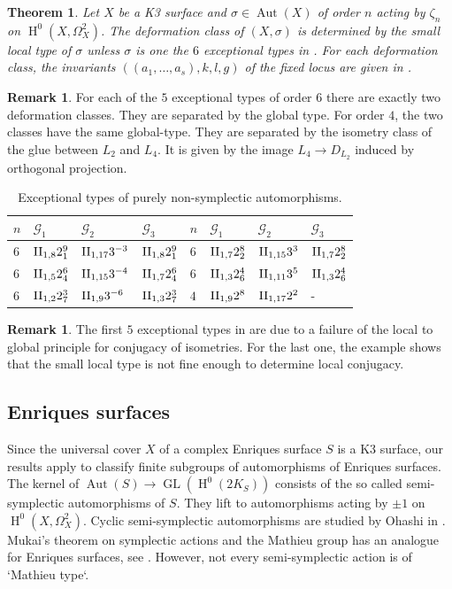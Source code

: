 \documentclass[a4paper]{amsart}
\theoremstyle{definition}
\newtheorem{remark}[definition]{Remark}
\theoremstyle{plain}
\newtheorem{theorem}[definition]{Theorem}
\DeclareMathOperator{\GL}{GL}
\DeclareMathOperator{\Aut}{Aut}
\DeclareMathOperator{\HH}{H}
\newcommand{\G}{\mathcal{G}}
\newcommand{\even}{\rm{II}}
\newcommand{\disc}[1]{{D_{#1}}}
\begin{document}
\begin{theorem}
 Let $X$ be a K3 surface and $\sigma \in \Aut(X)$ of order $n$ acting by $\zeta_n$ on $\HH^0(X,\Omega_X^2)$. The deformation class of $(X, \sigma)$ is determined by the small local type of $\sigma$ unless $\sigma$ is one the $6$ exceptional types in .
 For each deformation class, the invariants $((a_1, \dots, a_s), k, l, g)$ of the fixed locus are given in .
\end{theorem}
\begin{remark}
 For each of the $5$ exceptional types of order $6$ there are exactly two deformation classes. They are separated by the global type.
 For order $4$, the two classes have the same global-type. They are separated by the isometry class of the glue between $L_2$ and $L_4$. It is given by the image $L_4 \to \disc{L_2}$ induced by orthogonal projection.
\end{remark}
%
%
%
%
%
%
%
%
%
%
%
%
%
%
%
%
%
%
%
%

 \begin{table}[h]
  \caption{Exceptional types of purely non-symplectic automorphisms.}\label{exceptionaltype}
 \renewcommand{\arraystretch}{1.2}
 \begin{tabular}{llll|llll}
 \toprule
 $n$ & $\G_1$ & $\G_2$ & $\G_3$
 &$n$ & $\G_1$ & $\G_2$ & $\G_3$\\
 \hline
 $6$ & $\even_{1,8}2^9_1$& $\even_{1,17}3^{-3}$& $\even_{1,8}2^9_1$ &
 $6$ & $\even_{1,7}2^8_2$& $\even_{1,15}3^{3}$ & $\even_{1,7}2^8_2$\\
 $6$ & $\even_{1,5}2^6_4$& $\even_{1,15}3^{-4}$& $\even_{1,7}2^6_4$&
 $6$ & $\even_{1,3}2^4_6$& $\even_{1,11}3^{5}$ & $\even_{1,3}2^4_6$\\
 $6$ & $\even_{1,2}2^3_7$& $\even_{1,9}3^{-6}$ & $\even_{1,3}2^3_7$ &
 $4$ & $\even_{1,9}2^8$ & $\even_{1,17}2^2$& - \\
 \bottomrule
 \end{tabular}
 \end{table}

 \begin{remark}
The first $5$ exceptional types in  are due to a failure of the local to global principle for conjugacy of isometries. For the last one, the example shows that the small local type is not fine enough to determine local conjugacy.
\end{remark}

\subsection*{Enriques surfaces}
Since the universal cover $X$ of a complex Enriques surface $S$ is a K3 surface, our results apply to classify finite subgroups of automorphisms of Enriques surfaces. The kernel of $\Aut(S) \to \GL(\HH^0(2K_S))$ consists of the so called semi-symplectic automorphisms of $S$. They lift to automorphisms acting by $\pm 1$ on $\HH^0(X,\Omega_X^2)$.
Cyclic semi-symplectic automorphisms are studied by Ohashi in
\cite{ohashi2015}. Mukai's theorem on symplectic actions and the Mathieu group has an analogue for Enriques surfaces,
see \cite{mukai-ohashi2015}. However, not every semi-symplectic action is of `Mathieu type`.
\end{document}
